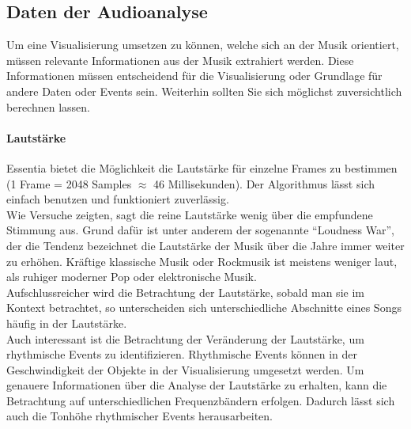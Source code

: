 \documentclass[11pt,a4paper]{article}
\begin{document}
\subsection{Daten der Audioanalyse}
Um eine Visualisierung umsetzen zu können, welche sich an der Musik orientiert, müssen relevante Informationen aus der Musik extrahiert werden. Diese Informationen müssen entscheidend für die Visualisierung oder Grundlage für andere Daten oder Events sein. Weiterhin sollten Sie sich möglichst zuversichtlich berechnen lassen.

\paragraph{Lautstärke}
Essentia bietet die Möglichkeit die Lautstärke für einzelne Frames  zu bestimmen (1 Frame = 2048 Samples $\approx$ 46 Millisekunden). Der Algorithmus lässt sich einfach benutzen und funktioniert zuverlässig.\\
Wie Versuche zeigten, sagt die reine Lautstärke wenig über die empfundene Stimmung aus. Grund dafür ist unter anderem der sogenannte ``Loudness War'', der die Tendenz bezeichnet die Lautstärke der Musik über die Jahre immer weiter zu erhöhen\cite{683ea11abc74c43c6680cd4c08dc538caee546575b59c2f40d70033cf3389ec8}. Kräftige klassische Musik oder  Rockmusik ist meistens weniger laut, als ruhiger moderner Pop oder elektronische Musik.\\
Aufschlussreicher wird die Betrachtung der Lautstärke, sobald man sie im Kontext betrachtet, so unterscheiden sich unterschiedliche Abschnitte eines Songs häufig in der Lautstärke.\\
Auch interessant ist die Betrachtung der Veränderung der Lautstärke, um rhythmische Events zu identifizieren. Rhythmische Events können in der Geschwindigkeit der Objekte in der Visualisierung umgesetzt werden. Um genauere Informationen über die Analyse der Lautstärke zu erhalten, kann die Betrachtung auf unterschiedlichen Frequenzbändern erfolgen. Dadurch lässt sich auch die Tonhöhe rhythmischer Events herausarbeiten.
\end{document}
